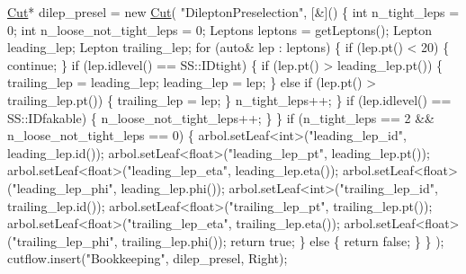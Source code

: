 \begin{DoxyEnumerate}
\begin{DoxyCode}
    \hyperlink{classCut}{Cut}* dilep\_presel = \textcolor{keyword}{new} \hyperlink{classCut}{Cut}(
        \textcolor{stringliteral}{"DileptonPreselection"},
        [&]()
        \{
            \textcolor{keywordtype}{int} n\_tight\_leps = 0;
            \textcolor{keywordtype}{int} n\_loose\_not\_tight\_leps = 0;
            Leptons leptons = getLeptons();
            Lepton leading\_lep;
            Lepton trailing\_lep;
            \textcolor{keywordflow}{for} (\textcolor{keyword}{auto}& lep : leptons)
            \{
                \textcolor{keywordflow}{if} (lep.pt() < 20) \{ \textcolor{keywordflow}{continue}; \}
                \textcolor{keywordflow}{if} (lep.idlevel() == SS::IDtight) 
                \{ 
                    \textcolor{keywordflow}{if} (lep.pt() > leading\_lep.pt()) 
                    \{ 
                        trailing\_lep = leading\_lep;
                        leading\_lep = lep; 
                    \}
                    \textcolor{keywordflow}{else} \textcolor{keywordflow}{if} (lep.pt() > trailing\_lep.pt()) \{ trailing\_lep = lep; \}
                    n\_tight\_leps++; 
                \}
                \textcolor{keywordflow}{if} (lep.idlevel() == SS::IDfakable) \{ n\_loose\_not\_tight\_leps++; \}
            \}
            \textcolor{keywordflow}{if} (n\_tight\_leps == 2 && n\_loose\_not\_tight\_leps == 0) 
            \{
                arbol.setLeaf<\textcolor{keywordtype}{int}>(\textcolor{stringliteral}{"leading\_lep\_id"}, leading\_lep.id());
                arbol.setLeaf<\textcolor{keywordtype}{float}>(\textcolor{stringliteral}{"leading\_lep\_pt"}, leading\_lep.pt());
                arbol.setLeaf<\textcolor{keywordtype}{float}>(\textcolor{stringliteral}{"leading\_lep\_eta"}, leading\_lep.eta());
                arbol.setLeaf<\textcolor{keywordtype}{float}>(\textcolor{stringliteral}{"leading\_lep\_phi"}, leading\_lep.phi());
                arbol.setLeaf<\textcolor{keywordtype}{int}>(\textcolor{stringliteral}{"trailing\_lep\_id"}, trailing\_lep.id());
                arbol.setLeaf<\textcolor{keywordtype}{float}>(\textcolor{stringliteral}{"trailing\_lep\_pt"}, trailing\_lep.pt());
                arbol.setLeaf<\textcolor{keywordtype}{float}>(\textcolor{stringliteral}{"trailing\_lep\_eta"}, trailing\_lep.eta());
                arbol.setLeaf<\textcolor{keywordtype}{float}>(\textcolor{stringliteral}{"trailing\_lep\_phi"}, trailing\_lep.phi());
                \textcolor{keywordflow}{return} \textcolor{keyword}{true};
            \}
            \textcolor{keywordflow}{else} \{ \textcolor{keywordflow}{return} \textcolor{keyword}{false}; \}
        \}
    );
    cutflow.insert(\textcolor{stringliteral}{"Bookkeeping"}, dilep\_presel, Right);


\end{DoxyCode}
\end{DoxyEnumerate}

